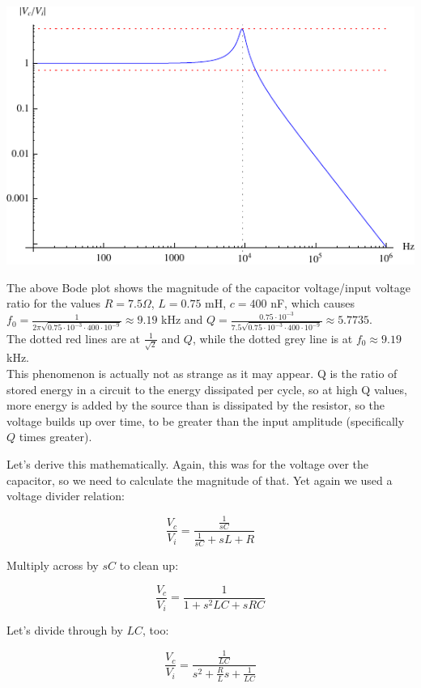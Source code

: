\documentclass[12pt,a4paper]{report}
\begin{document}
\includegraphics[scale=1.75]{Graphics/lpf_peakiness}

The above Bode plot shows the magnitude of the capacitor voltage/input voltage ratio for the values $R = 7.5 \Omega$, $L = 0.75$ mH, $c = 400$ nF, which causes $\displaystyle f_0 = \frac{1}{2\pi \sqrt{0.75\cdot10^{-3} \cdot 400 \cdot 10^{-9} }} \approx 9.19$ kHz and $\displaystyle Q = \frac{0.75 \cdot 10^{-3}}{7.5 \sqrt{0.75 \cdot 10^{-3} \cdot 400 \cdot 10^{-9}}} \approx 5.7735$.\\
The dotted red lines are at $\displaystyle \frac{1}{\sqrt{2}}$ and $Q$, while the dotted grey line is at $f_0 \approx 9.19$ kHz.\\

This phenomenon is actually not as strange as it may appear. Q is the ratio of stored energy in a circuit to the energy dissipated per cycle, so at high Q values, more energy is added by the source than is dissipated by the resistor, so the voltage builds up over time, to be greater than the input amplitude (specifically $Q$ times greater).

Let's derive this mathematically. Again, this was for the voltage over the capacitor, so we need to calculate the magnitude of that. Yet again we used a voltage divider relation:

\[ \frac{V_c}{V_i} = \frac{\frac{1}{sC}}{\frac{1}{sC} + sL + R} \]

Multiply across by $sC$ to clean up:

\[ \frac{V_c}{V_i} = \frac{1}{1 + s^2LC + sRC} \]

Let's divide through by $LC$, too:

\[ \frac{V_c}{V_i} = \frac{\frac{1}{LC}}{s^2 + \frac{R}{L} s + \frac{1}{LC}} \]
\end{document}
